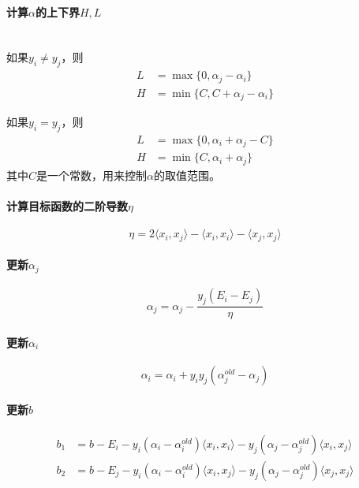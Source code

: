 \documentclass[a4paper]{article}
\begin{document}
\paragraph*{计算$\alpha$的上下界$H, L$}
\ \\
如果$y_i \neq y_j$，则
\begin{align*}
    L &= \max\{0, \alpha_j - \alpha_i\} \\
    H &= \min\{C, C + \alpha_j - \alpha_i\}
\end{align*}

如果$y_i = y_j$，则
\begin{align*}
    L &= \max\{0, \alpha_i + \alpha_j - C\} \\
    H &= \min\{C, \alpha_i + \alpha_j\}
\end{align*}
其中$C$是一个常数，用来控制$\alpha$的取值范围。

\paragraph*{计算目标函数的二阶导数$\eta$}
\[\eta = 2\langle x_i, x_j\rangle - \langle x_i, x_i\rangle - \langle x_j, x_j\rangle\]

\paragraph*{更新$\alpha_j$}
\[\alpha_j = \alpha_j - \frac{y_j(E_i - E_j)}{\eta}\]

\paragraph*{更新$\alpha_i$}
\[\alpha_i = \alpha_i + y_iy_j(\alpha_j^{old} - \alpha_j)\]

\paragraph*{更新$b$}
\begin{align*}
    b_1 &= b - E_i - y_i(\alpha_i - \alpha_i^{old})\langle x_i, x_i\rangle - y_j(\alpha_j - \alpha_j^{old})\langle x_i, x_j\rangle \\
    b_2 &= b - E_j - y_i(\alpha_i - \alpha_i^{old})\langle x_i, x_j\rangle - y_j(\alpha_j - \alpha_j^{old})\langle x_j, x_j\rangle
\end{align*}
\end{document}
